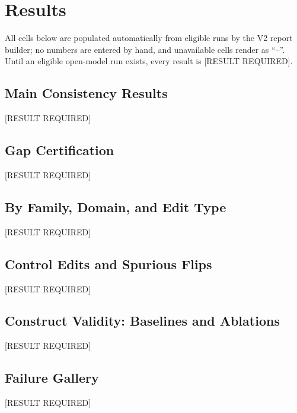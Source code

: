 \section{Results}

All cells below are populated automatically from eligible runs by the V2 report
builder; no numbers are entered by hand, and unavailable cells render as ``--''.
Until an eligible open-model run exists, every result is [RESULT REQUIRED].

\subsection{Main Consistency Results}
[RESULT REQUIRED]

\subsection{Gap Certification}
[RESULT REQUIRED]

\subsection{By Family, Domain, and Edit Type}
[RESULT REQUIRED]

\subsection{Control Edits and Spurious Flips}
[RESULT REQUIRED]

\subsection{Construct Validity: Baselines and Ablations}
[RESULT REQUIRED]

\subsection{Failure Gallery}
[RESULT REQUIRED]
